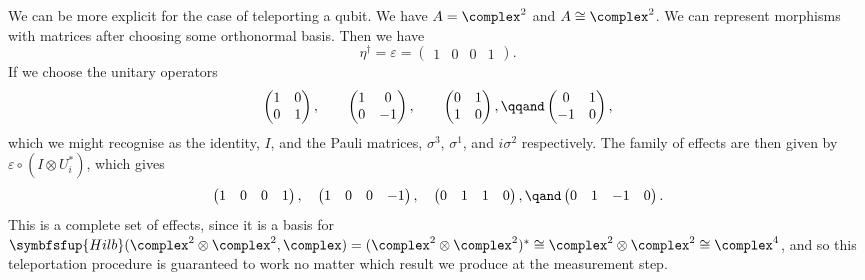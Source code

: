 \documentclass[fleqn]{NotesClass}
\makeatletter
\newcommand{\c@egory}[1]{\symbfsfup{#1}}
\newcommand{\Hilb}{\c@egory{Hilb}}
\newcommand{\isomorphic}{\cong}
\makeatother
\begin{document}
    We can be more explicit for the case of teleporting a qubit.
    We have \(A = \complex^2\) and \(A \isomorphic \complex^2\).
    We can represent morphisms with matrices after choosing some orthonormal basis.
    Then we have
    \begin{equation}
        \eta^\dagger = \varepsilon = 
        \begin{pmatrix}
            1 & 0 & 0 & 1
        \end{pmatrix}
        .
    \end{equation}
    If we choose the unitary operators
    \begin{equation}
        \begin{pmatrix}
            1 & 0\\
            0 & 1
        \end{pmatrix}
        , \qquad
        \begin{pmatrix}
            1 & 0\\
            0 & -1
        \end{pmatrix}
        , \qquad 
        \begin{pmatrix}
            0 & 1\\
            1 & 0
        \end{pmatrix}
        , \qqand 
        \begin{pmatrix}
            0 & 1\\
            -1 & 0
        \end{pmatrix}
        ,
    \end{equation}
    which we might recognise as the identity, \(I\), and the Pauli matrices, \(\sigma^3\), \(\sigma^1\), and \(i\sigma^2\) respectively.
    The family of effects are then given by \(\varepsilon \circ (I \otimes U_i^*)\), which gives
    \begin{equation*}
        \begin{pmatrix}
            1 & 0 & 0 & 1
        \end{pmatrix}
        , \quad 
        \begin{pmatrix}
            1 & 0 & 0 & -1
        \end{pmatrix}
        , \quad 
        \begin{pmatrix}
            0 & 1 & 1 & 0
        \end{pmatrix}
        , \qand
        \begin{pmatrix}
            0 & 1 & -1 & 0
        \end{pmatrix}
        .
    \end{equation*}
    This is a complete set of effects, since it is a basis for \(\Hilb(\complex^2 \otimes \complex^2, \complex) = (\complex^2 \otimes \complex^2)^* \isomorphic \complex^2 \otimes \complex^2 \isomorphic \complex^4\), and so this teleportation procedure is guaranteed to work no matter which result we produce at the measurement step.
    
\end{document}

